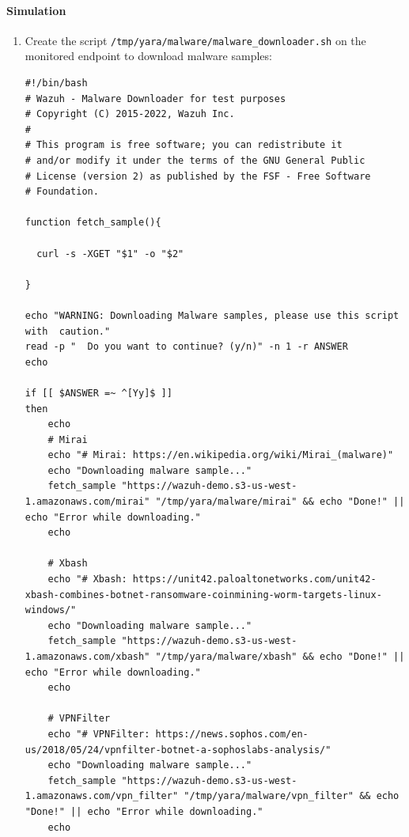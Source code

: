 \paragraph{Simulation}
\begin{enumerate}
    \item Create the script \texttt{/tmp/yara/malware/malware\_downloader.sh} on the monitored endpoint to download malware samples:
    \begin{verbatim}
#!/bin/bash
# Wazuh - Malware Downloader for test purposes
# Copyright (C) 2015-2022, Wazuh Inc.
#
# This program is free software; you can redistribute it
# and/or modify it under the terms of the GNU General Public
# License (version 2) as published by the FSF - Free Software
# Foundation.

function fetch_sample(){

  curl -s -XGET "$1" -o "$2"

}

echo "WARNING: Downloading Malware samples, please use this script with  caution."
read -p "  Do you want to continue? (y/n)" -n 1 -r ANSWER
echo

if [[ $ANSWER =~ ^[Yy]$ ]]
then
    echo
    # Mirai
    echo "# Mirai: https://en.wikipedia.org/wiki/Mirai_(malware)"
    echo "Downloading malware sample..."
    fetch_sample "https://wazuh-demo.s3-us-west-1.amazonaws.com/mirai" "/tmp/yara/malware/mirai" && echo "Done!" || echo "Error while downloading."
    echo

    # Xbash
    echo "# Xbash: https://unit42.paloaltonetworks.com/unit42-xbash-combines-botnet-ransomware-coinmining-worm-targets-linux-windows/"
    echo "Downloading malware sample..."
    fetch_sample "https://wazuh-demo.s3-us-west-1.amazonaws.com/xbash" "/tmp/yara/malware/xbash" && echo "Done!" || echo "Error while downloading."
    echo

    # VPNFilter
    echo "# VPNFilter: https://news.sophos.com/en-us/2018/05/24/vpnfilter-botnet-a-sophoslabs-analysis/"
    echo "Downloading malware sample..."
    fetch_sample "https://wazuh-demo.s3-us-west-1.amazonaws.com/vpn_filter" "/tmp/yara/malware/vpn_filter" && echo "Done!" || echo "Error while downloading."
    echo


\end{verbatim}
\end{enumerate}
